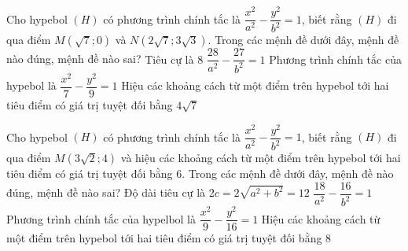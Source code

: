 \begin{ex}%
	Cho hypebol $(H)$ có phương trình chính tắc là $\dfrac{x^2}{a^2} - \dfrac{y^2}{b^2} = 1$, biết rằng  $(H)$ đi qua điểm $M\left(\sqrt{7};0\right)$ và $N\left(2\sqrt{7};3\sqrt{3}\right)$. Trong các mệnh đề dưới đây, mệnh đề nào đúng, mệnh đề nào sai?
	\choiceTF 
		{\True Tiêu  cự là $8$}
		{\True  $\dfrac{28}{a^2}-\dfrac{27}{b^2}=1$}
		{\True Phương trình chính tắc  của hypebol là $\dfrac{x^2}{7}-\dfrac{y^2}{9}=1$}
		{Hiệu các khoảng cách từ một  điểm trên hypebol tới hai tiêu điểm có giá trị tuyệt đối bằng $4\sqrt{7}$}
\end{ex}

\begin{ex}%
	Cho hypebol $(H)$ có phương trình chính tắc là $\dfrac{x^2}{a^2} - \dfrac{y^2}{b^2} = 1$, biết rằng  $(H)$ đi qua điểm $M\left(3\sqrt{2};4\right)$ và hiệu các khoảng cách từ một điểm trên hypebol tới hai tiêu điểm có giá trị tuyệt đối bằng $6$. Trong các mệnh đề dưới đây, mệnh đề nào đúng, mệnh đề nào sai?
	 \choiceTF
		{Độ  dài tiêu cự là $2c=2\sqrt{a^2+b^2}=12$}
		 {\True $\dfrac{18}{a^2}-\dfrac{16}{b^2}=1$}
		{\True  Phương trình chính tắc của hypelbol là $\dfrac{x^2}{9}-\dfrac{y^2}{16}=1$}
		{Hiệu các khoảng cách từ một điểm trên hypebol tới  hai tiêu điểm có giá trị tuyệt đối bằng $8$}
\end{ex}


